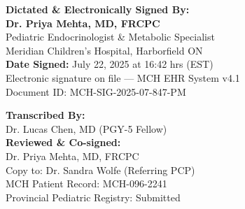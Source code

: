\documentclass[11pt,a4paper]{article}
\begin{document}
\begin{tcolorbox}[
  enhanced,
  colback=PedLight,
  colframe=PedBlue,
  arc=3pt,
  boxrule=0.8pt,
  top=10pt, bottom=10pt, left=12pt, right=12pt
]
  \begin{minipage}[t]{0.55\linewidth}
    \vspace{0pt}
    {\small\color{PedBlue}\textbf{Dictated \& Electronically Signed By:}}\\[6pt]
    {\normalsize\textbf{Dr. Priya Mehta, MD, FRCPC}}\\
    {\small Pediatric Endocrinologist \& Metabolic Specialist}\\
    {\small Meridian Children's Hospital, Harborfield ON}\\[4pt]
    {\small\textbf{Date Signed:} July 22, 2025 at 16:42 hrs (EST)}\\[4pt]
    {\small\color{GrayText}Electronic signature on file --- MCH EHR System v4.1\\
    Document ID: MCH-SIG-2025-07-847-PM}\\[8pt]
  \end{minipage}%
  \hfill
  \begin{minipage}[t]{0.40\linewidth}
    \vspace{0pt}
    \raggedleft
    {\small\color{PedTeal}\textbf{Transcribed By:}}\\[2pt]
    {\small Dr. Lucas Chen, MD (PGY-5 Fellow)}\\[4pt]
    {\small\color{PedTeal}\textbf{Reviewed \& Co-signed:}}\\[2pt]
    {\small Dr. Priya Mehta, MD, FRCPC}\\[6pt]
    {\small\color{GrayText}
    Copy to: Dr. Sandra Wolfe (Referring PCP)\\
    MCH Patient Record: MCH-096-2241\\
    Provincial Pediatric Registry: Submitted
    }\\[6pt]
  \end{minipage}
\end{tcolorbox}
\end{document}
